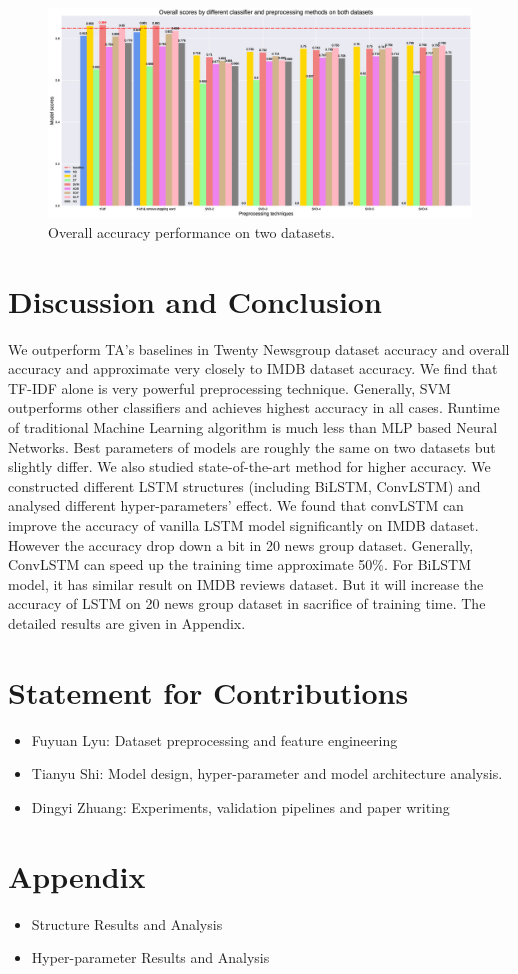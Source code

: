 \documentclass[11pt]{scrartcl}
\begin{document}
\begin{figure}[H]
	\centering
	\includegraphics[width=0.9 \linewidth]{fig/model_acc_overall.eps}
	\caption{Overall accuracy performance on two datasets.}
	\label{overall_accuracy}
\end{figure}



\section{Discussion and Conclusion}
We outperform TA's baselines in Twenty Newsgroup dataset accuracy and overall accuracy and approximate very closely to IMDB dataset accuracy. We find that TF-IDF alone is very powerful preprocessing technique. Generally, SVM outperforms other classifiers and achieves highest accuracy in all cases. Runtime of traditional Machine Learning algorithm is much less than MLP based Neural Networks. Best parameters of models are roughly the same on two datasets but slightly differ. We also studied state-of-the-art method for higher accuracy. We constructed different LSTM structures (including BiLSTM\cite{graves2013hybrid}, ConvLSTM\cite{LSTM+CNN}) and analysed different hyper-parameters' effect. We found that convLSTM can improve the accuracy of vanilla LSTM model significantly on IMDB  dataset. However the accuracy drop down a bit in 20 news group dataset. Generally, ConvLSTM can speed up the training time approximate 50\%. For BiLSTM model, it has similar result on IMDB reviews dataset. But it will increase the accuracy of LSTM on 20 news group dataset in sacrifice of training time. The detailed results are given in Appendix.

\section{Statement for Contributions}
\begin{itemize}
	\item Fuyuan Lyu: Dataset preprocessing and feature engineering
	\item Tianyu Shi: Model design, hyper-parameter and model architecture analysis.
	\item Dingyi Zhuang: Experiments, validation pipelines and paper writing
\end{itemize}
\newpage



\section{Appendix}
\begin{itemize}
	\item Structure Results and Analysis
	\item Hyper-parameter  Results and Analysis
	
\end{itemize}
\end{document}
